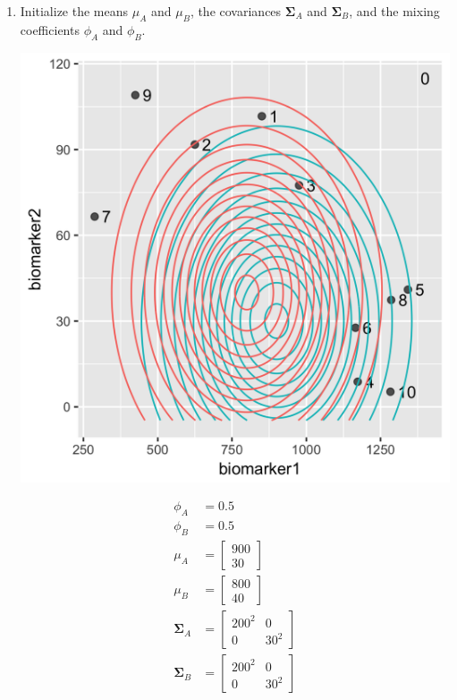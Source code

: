 \begin{enumerate}
\item Initialize the means $\mu_A$ and $\mu_B$, the covariances $\boldsymbol\Sigma_A$ and $\boldsymbol\Sigma_B$, and the mixing coefficients $\phi_A$ and $\phi_B$. 

\begin{minipage}[t]{0.45\textwidth}
\begin{center}
\includegraphics[scale=0.15]{img/biomarker-data-labels-0.png}
\end{center}
\end{minipage}
\qquad
\begin{minipage}[t]{0.45\textwidth}
\small
\begin{align*} 
\phi_A &= 0.5 \\
\phi_B &= 0.5 \\
\mu_A &= \begin{bmatrix} 900 \\ 30 \end{bmatrix} \\
\mu_B &= \begin{bmatrix} 800 \\ 40 \end{bmatrix} \\
\boldsymbol\Sigma_A &= \begin{bmatrix} 200^2 & 0 \\ 0 & 30^2 \end{bmatrix} \\
\boldsymbol\Sigma_B &= \begin{bmatrix} 200^2 & 0 \\ 0 & 30^2 \end{bmatrix}
\end{align*}
\end{minipage}


\end{enumerate}
